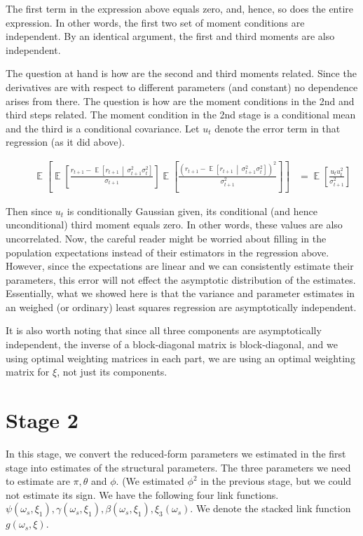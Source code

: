 \documentclass[11pt, letterpaper, twoside, final]{article}
\newcommand*{\mvert}{\,\middle\vert\,}
\DeclareMathOperator*{\E}{\mathbb{E}}
\begin{document}
The first term in the expression above equals zero, and, hence, so does the entire expression. 
In other words, the first two set of moment conditions are independent.
By an identical argument, the first and third moments are also independent.

The question at hand is how are the second and third moments related.
Since the derivatives are with respect to different parameters (and constant) no dependence arises from there.
The question is how are the moment conditions in the 2nd and third steps related.
The moment condition in the 2nd stage is a conditional mean and the third is a conditional covariance.
Let $u_t$ denote the error term in that regression (as it did above).

\begin{align}
    &\phantom{=} \E\left[\E\left[\frac{r_{t+1} - \E\left[r_{t+1}\mvert \sigma^2_{t+1}
      \sigma^2_t\right]}{\sigma_{t+1}} \right] \E\left[\frac{(r_{t+1} - \E\left[r_{t+1} \mvert \sigma^2_{t+1}
      \sigma^2_t\right])^2}{\sigma^2_{t+1}}\right] \right] 
%
      &= \E\left[\frac{u_t u_t^2}{\sigma^2_{t+1}}\right] 
\end{align}

Then since $u_t$ is conditionally Gaussian given, its conditional (and hence unconditional) third moment equals
zero.  In other words, these values are also uncorrelated.
Now, the careful reader might be worried about filling in the population expectations instead of their estimators
in the regression above.
However, since the expectations are linear and we can consistently estimate their parameters, this error will not
effect the asymptotic distribution of the estimates.
Essentially, what we showed here is that the variance and parameter estimates in an weighed (or ordinary) least
squares regression are asymptotically independent.

It is also worth noting that since all three components are asymptotically independent, the inverse of a
block-diagonal matrix is block-diagonal, and we using optimal weighting matrices in each part, we are using an
optimal weighting matrix for $\xi$, not just its components.



\section{Stage 2}

In this stage, we convert the reduced-form parameters we estimated in the first stage into estimates of the
structural parameters.
The three parameters we need to estimate are $\pi, \theta$ and $\phi$.
(We estimated $\phi^2$ in the previous stage, but we could not estimate its sign.
We have the following four link functions.
$\psi(\omega_s, \xi_1), \gamma(\omega_s, \xi_1), \beta(\omega_s, \xi_1), \xi_3(\omega_s)$.
We denote the stacked link function $g\left(\omega_s, \xi\right)$.
\end{document}

